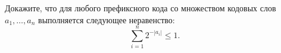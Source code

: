 Докажите, что для любого префиксного кода со множеством кодовых слов $a_1, \dots, a_n$ выполняется
следующее неравенство:
$$
    \sum_{i = 1}^{n} 2^{-|a_i|} \le 1.
$$
